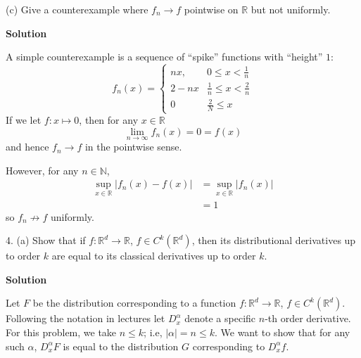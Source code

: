 \documentclass{article}
\begin{document}
\vspace{5mm}

(c) Give a counterexample where $f_n \to f$ pointwise on
$\mathbb{R}$ but not uniformly.

\textbf{Solution}

A simple counterexample is a sequence of ``spike'' functions with
``height'' $1$:
%
\begin{equation*}
    f_n(x) =
        \begin{cases}
            n x, & 0 \leq x < \frac{1}{n} \\
            2 - n x & \frac{1}{n} \leq x < \frac{2}{n} \\
            0 & \frac{2}{N} \leq x
        \end{cases}
\end{equation*}
%
If we let $f: x \mapsto 0$, then for any $x \in \mathbb{R}$
%
\begin{equation*}
    \lim_{n \to \infty} f_n(x) = 0 = f(x)
\end{equation*}
%
and hence $f_n \to f$ in the pointwise sense.

However, for any $n \in \mathbb{N}$,
%
\begin{align*}
    \sup_{x \in \mathbb{R}} |f_n(x) - f(x)|
        &= \sup_{x \in \mathbb{R}} |f_n(x)| \\
        &= 1
\end{align*}
%
so $f_n \not\to f$ uniformly.

\newpage

4. (a) Show that if $f : \mathbb{R}^{d} \rightarrow \mathbb{R}$,
$f \in C^k(\mathbb{R}^d)$, then its distributional derivatives up to
order $k$ are equal to its classical derivatives up to order $k$.

\textbf{Solution}

Let $F$ be the distribution corresponding to a
function $f : \mathbb{R}^{d} \rightarrow \mathbb{R}$, $f \in
C^k(\mathbb{R}^d)$. Following the notation in lectures let $D_x^\alpha$
denote a specific $n$-th order derivative. For this problem, we take $n
\leq k$; i.e, $|\alpha| = n \leq k$. We want to show that for any such
$\alpha$, $D_x^\alpha F$ is equal to the distribution $G$ corresponding
to $D_x^\alpha f$.
\end{document}
